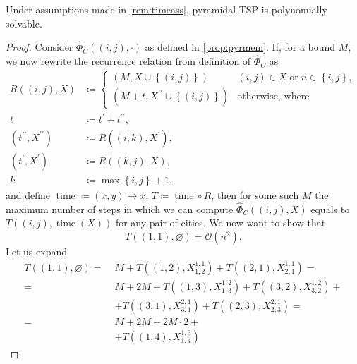 \documentclass[index=totoc,bibliography=totoc]{scrartcl}
\numberwithin{equation}{section}
\numberwithin{figure}{section}
\numberwithin{table}{section}
\begin{document}
\begin{corollary}
\label{cor:pyrtime}
  Under assumptions made in \cref{rem:timeass},
  pyramidal TSP is polynomially solvable.
\end{corollary}
\begin{proof}
  Consider $\widehat{\Phi}_C\left((i,j),\cdot\right)$ as defined in \cref{prop:pyrmem}.
  If, for a bound $M$,
  we now rewrite the recurrence relation from definition of $\widehat{\Phi}_C$ as
  \begin{align}
    \label{eq:pyrtime}
    R\left((i,j),X\right) & \coloneqq
    \begin{cases}
      \left(M,X \cup \left\{(i,j)\right\}\right) & (i,j) \in X \;\text{or}\; n \in \left\{i,j\right\},
      \\
      \left(M+t,X^{\prime\prime} \cup \left\{(i,j)\right\}\right) & \text{otherwise, where}
    \end{cases}
    \\
    t & \coloneqq t^{\prime} + t^{\prime\prime},
    \nonumber
    \\
    \left(t^{\prime\prime},X^{\prime\prime}\right) & \coloneqq R\left((i,k),X^\prime\right),
    \nonumber
    \\
    \left(t^{\prime},X^{\prime}\right) & \coloneqq R\left((k,j),X\right),
    \nonumber
    \\
    k & \coloneqq \max \left\{i,j\right\} + 1,
    \nonumber
  \end{align}
  and define $\operatorname{time} \coloneqq (x,y) \mapsto x$,
  $T \coloneqq \operatorname{time} \circ R$,
  then for some such $M$
  the maximum number of steps in which we can compute
  $\widehat{\Phi}_C\left((i,j),X\right)$
  equals to
  $T\left((i,j),\operatorname{time}\left(X\right)\right)$
  for any pair of cities.
  We now want to show that
  \[
    T\left((1,1),\varnothing\right) = \mathcal{O}\left(n^2\right).
  \]
  Let us expand
  \begin{align*}
    T\left((1,1),\varnothing\right) =\; &
    M + T\left((1,2),X_{1,2}^{1,1}\right)
      + T\left((2,1),X_{2,1}^{1,1}\right) =
    \\ =\; & M + 2M + T\left((1,3),X_{1,3}^{1,2}\right)
                  + T\left((3,2),X_{3,2}^{1,2}\right) +
             \\ & + T\left((3,1),X_{3,1}^{2,1}\right)
                  + T\left((2,3),X_{2,3}^{2,1}\right) =
    \\ =\; & M + 2M + 2M\cdot 2 +
    \\ & + T\left((1,4),X_{1,4}^{1,3}\right)

\end{align*}
\end{proof}
\end{document}
